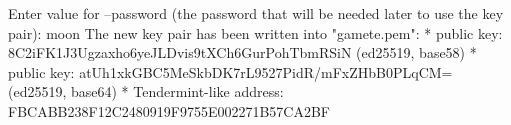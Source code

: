 \begin{shellbox}\begin{ttlst}
Enter value for --password (the password that will be needed later to use the key pair): moon
The new key pair has been written into "gamete.pem":
* public key: 8C2iFK1J3Ugzaxho6yeJLDvis9tXCh6GurPohTbmRSiN (ed25519, base58)
* public key: atUh1xkGBC5MeSkbDK7rL9527PidR/mFxZHbB0PLqCM= (ed25519, base64)
* Tendermint-like address: FBCABB238F12C2480919F9755E002271B57CA2BF
\end{ttlst}\end{shellbox}
